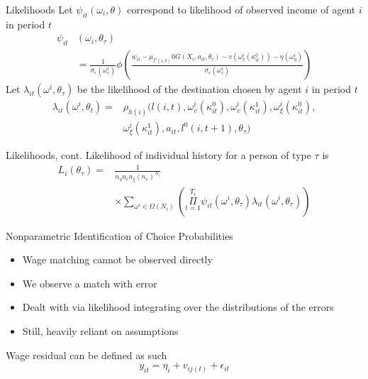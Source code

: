 \documentclass[aspectratio=169,professionalfonts]{beamer}
\begin{document}
\begin{frame}{Likelihoods}
  Let $\psi_{it}(\omega_i, \theta)$ correspond to likelihood of observed income of agent $i$ in period $t$
  \begin{equation}
    \begin{split}
      \psi_{it} &(\omega_i,\theta_{\tau})  \\
      &=\frac{1}{\sigma_{\epsilon}(\omega_{\epsilon}^i)}\phi(\frac{w_{it} - \mu_{l^0(i,t)} 0 G(X_i, a_{it},\theta_{\tau}) - v(\omega_v^i(\kappa_{it}^0)) - \eta(\omega_{\eta}^i)}{\sigma_{\epsilon}(\omega_{\epsilon}^i)})
    \end{split}
  \end{equation}
  Let $\lambda_{it}(\omega^i, \theta_{\tau})$ be the likelihood of the destination chosen by agent $i$ in period $t$
  \begin{equation}
    \begin{split}
      \lambda_{it}(\omega^i, \theta_t) =& \rho_{h(i)}(l(i,t), \omega_v^i(\kappa_{it}^0), \omega_v^i(\kappa_{it}^1), \omega_{\xi}^i(\kappa_{it}^0), \\
                   & \omega_{\xi}^i(\kappa_{it}^1), a_{it}, l^0(i, t+1), \theta_{\tau})
    \end{split}
  \end{equation}
\end{frame}

\begin{frame}{Likelihoods, cont.}
  Likelihood of individual history for a person of type $\tau$ is
  \begin{equation}
    \begin{split}
      L_i(\theta_{\tau}) = &\frac{1}{n_{\eta}n_{\epsilon}n_{\xi}(n_v)^{N_i}} \\
      & \times \sum\limits_{\omega^i\in\Omega(N_i)}(\Pi\limits_{t=1}^{T_i}\psi_{it}(\omega^i,\theta_{\tau})\lambda_{it}(\omega^i,\theta_{\tau}))
    \end{split}
  \end{equation}
\end{frame}

\begin{frame}{Nonparametric Identification of Choice Probabilities}
  \begin{itemize}
  \item Wage matching cannot be observed directly
  \item We observe a match with error
  \item Dealt with via likelihood integrating over the distributions  of the errors
  \item Still, heavily reliant on assumptions
  \end{itemize}
  Wage residual can be defined as such
  \begin{equation}
    y_{it} = \eta_i + v_{ij(t)}+\epsilon_{it}
  \end{equation}
\end{frame}
\end{document}
